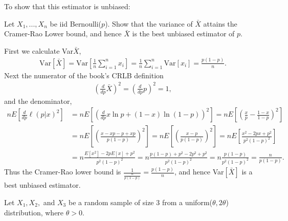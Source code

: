 \documentclass[12pt,letterpaper]{exam}
\begin{document}
\begin{questions}
\begin{solution}
\begin{parts}
			To show that this estimator is unbiased:
			
		\end{parts}
	\end{solution}
	
\clearpage

\setcounter{question}{40-1}
\question Let $X_1,...,X_n$ be iid Bernoulli($p$). Show that the variance of $\bar{X}$ attains the Cramer-Rao Lower bound, and hence $\bar{X}$ is the best unbiased estimator of $p$.
	\begin{solution}
		First we calculate Var\(\bar{X}\),
		\begin{align*}
			\text{Var}[\bar{X}]
			= \text{Var}\left[\frac{1}{n}\sum_{i=1}^{n}x_i\right]
			= \frac{1}{n}\sum_{i=1}^{n}\text{Var}[x_i]
			= \frac{p(1-p)}{n}.
		\end{align*}
		Next the numerator of the book's CRLB definition
		\begin{align*}
			\left(\frac{d}{dp}\bar{X}\right)^2
			=\left(\frac{d}{dp}p\right)^2
			=1,
		\end{align*}
		and the denominator, 
		\begin{align*}
			nE\left[\frac{d}{dp}\ell(p|x)^2\right] &
			= nE\left[\left(\frac{d}{dp}x\ln p + (1-x)\ln(1-p)\right)^2\right]
			= nE\left[\left(\frac{x}{p} - \frac{1-x}{1-p}\right)^2\right] \\&
			= nE\left[\left(\frac{x-xp-p+xp}{p(1-p)}\right)^2\right]
			= nE\left[\left(\frac{x-p}{p(1-p)}\right)^2\right]
			= nE\left[\frac{x^2-2px+p^2}{p^2(1-p)^2}\right] \\&
			= n\frac{E[x^2]-2pE[x]+p^2}{p^2(1-p)^2}
			= n\frac{p(1-p)+p^2-2p^2+p^2}{p^2(1-p)^2}
			= n\frac{p(1-p)}{p^2(1-p)^2}
			= \frac{n}{p(1-p)}.
		\end{align*}
		Thus the Cramer-Rao lower bound is
		\(\frac{1}{\frac{n}{p(1-p)}} = \frac{p(1-p)}{n}\),
		and hence Var\([\bar{X}]\) is a best unbiased estimator.
	\end{solution}

\setcounter{question}{46-1}
\question Let $X_1, X_2,$ and $X_3$ be a random sample of size 3 from a uniform($\theta, 2\theta$) distribution, where $\theta >0$.
\end{questions}
\end{document}

